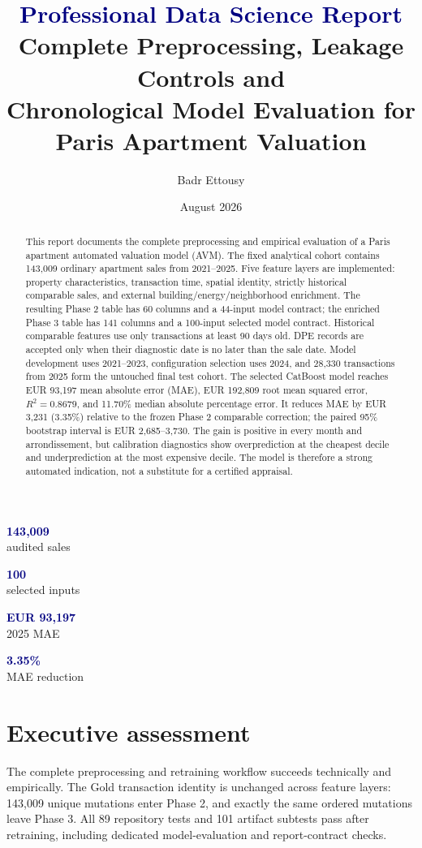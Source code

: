 \documentclass[11pt,a4paper]{article}
\title{\textcolor{navy}{\textbf{Professional Data Science Report}}\\[0.25em]
\large Complete Preprocessing, Leakage Controls and\\
Chronological Model Evaluation for Paris Apartment Valuation}
\author{Badr Ettousy}
\date{August 2026}
\newcommand{\metriccard}[2]{%
  \colorbox{light}{\begin{minipage}[c][1.55cm][c]{0.215\textwidth}
  \centering\textcolor{navy}{\Large\textbf{#1}}\\[-0.1em]
  \small\textcolor{muted}{#2}
  \end{minipage}}}
\begin{document}
\maketitle

\begin{abstract}
This report documents the complete preprocessing and empirical evaluation of a
Paris apartment automated valuation model (AVM). The fixed analytical cohort
contains 143,009 ordinary apartment sales from 2021--2025. Five feature layers
are implemented: property characteristics, transaction time, spatial identity,
strictly historical comparable sales, and external building/energy/neighborhood
enrichment. The resulting Phase 2 table has 60 columns and a 44-input model
contract; the enriched Phase 3 table has 141 columns and a 100-input selected
model contract. Historical comparable features use only transactions at least
90 days old. DPE records are accepted only when their diagnostic date is no
later than the sale date. Model development uses 2021--2023, configuration
selection uses 2024, and 28,330 transactions from 2025 form the untouched final
test cohort. The selected CatBoost model reaches EUR 93,197 mean absolute error
(MAE), EUR 192,809 root mean squared error, $R^2=0.8679$, and 11.70\% median
absolute percentage error. It reduces MAE by EUR 3,231 (3.35\%) relative to the
frozen Phase 2 comparable correction; the paired 95\% bootstrap interval is EUR
2,685--3,730. The gain is positive in every month and arrondissement, but
calibration diagnostics show overprediction at the cheapest decile and
underprediction at the most expensive decile. The model is therefore a strong
automated indication, not a substitute for a certified appraisal.
\end{abstract}

\vspace{0.5em}
\begin{center}
\metriccard{143,009}{audited sales} \hfill
\metriccard{100}{selected inputs} \hfill
\metriccard{EUR 93,197}{2025 MAE} \hfill
\metriccard{3.35\%}{MAE reduction}
\end{center}

\tableofcontents
\clearpage

\section{Executive assessment}

The complete preprocessing and retraining workflow succeeds technically and
empirically. The Gold transaction identity is unchanged across feature layers:
143,009 unique mutations enter Phase 2, and exactly the same ordered mutations
leave Phase 3. All 89 repository tests and 101 artifact subtests pass after
retraining, including dedicated model-evaluation and report-contract checks.
\end{document}
